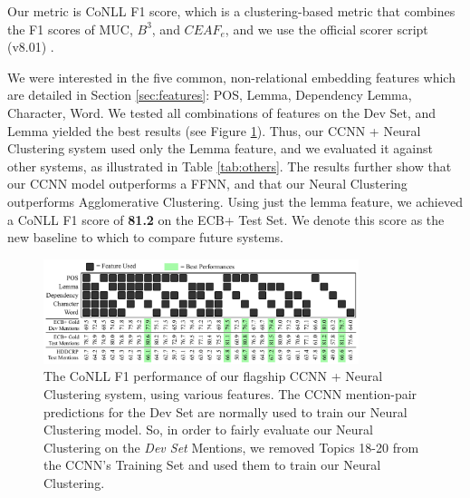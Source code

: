 \documentclass[11pt,a4paper]{article}
\begin{document}
Our metric is CoNLL F1 score, which is a clustering-based metric that combines the F1 scores of MUC, $B^{3}$, and $CEAF_{e}$, and we use the official scorer script (v8.01) \cite{Pradhan+etal:14a}.

We were interested in the five common, non-relational embedding features which are detailed in Section \ref{sec:features}: POS, Lemma, Dependency Lemma, Character, Word.  We tested all combinations of features on the Dev Set, and Lemma yielded the best results (see Figure \ref{fig:allfeatures}).  Thus, our CCNN + Neural Clustering system used only the Lemma feature, and we evaluated it against other systems, as illustrated in Table \ref{tab:others}.  The results further show that our CCNN model outperforms a FFNN, and that our Neural Clustering outperforms Agglomerative Clustering.  Using just the lemma feature, we achieved a CoNLL F1 score of \textbf{81.2} on the ECB+ Test Set.  We denote this score as the new baseline to which to compare future systems.

\begin{figure}[h]
\centering
	\includegraphics[width=0.82\textwidth]{features.pdf}
	\caption{The CoNLL F1 performance of our flagship CCNN + Neural Clustering system, using various features.  The CCNN mention-pair predictions for the Dev Set are normally used to train our Neural Clustering model.  So, in order to fairly evaluate our Neural Clustering on the \textit{Dev Set} Mentions, we removed Topics 18-20 from the CCNN's Training Set and used them to train our Neural Clustering.}
	\label{fig:allfeatures}
\end{figure}
\end{document}
